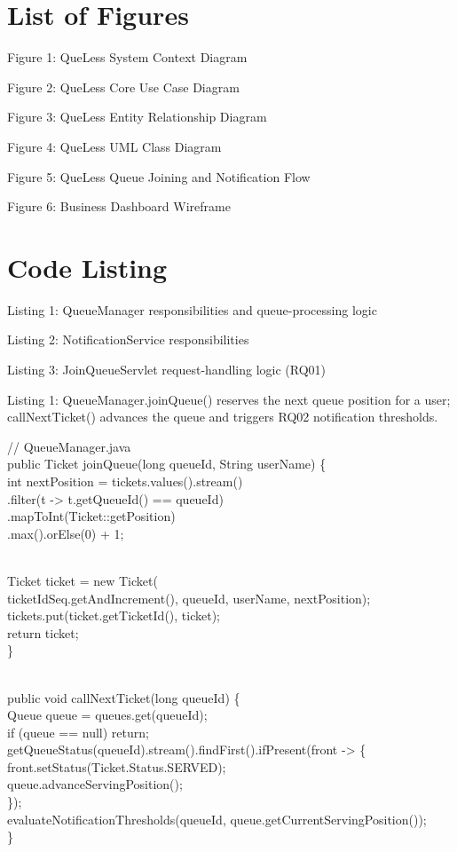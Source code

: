 \documentclass[
]{article}
\begin{document}
\section{List of Figures}\label{list-of-figures}

Figure 1: QueLess System Context Diagram

Figure 2: QueLess Core Use Case Diagram

Figure 3: QueLess Entity Relationship Diagram

Figure 4: QueLess UML Class Diagram

Figure 5: QueLess Queue Joining and Notification Flow

Figure 6: Business Dashboard Wireframe

\section{Code Listing}\label{code-listing}

Listing 1: QueueManager responsibilities and queue-processing logic

Listing 2: NotificationService responsibilities

Listing 3: JoinQueueServlet request-handling logic (RQ01)

Listing 1: QueueManager.joinQueue() reserves the next queue position for
a user; callNextTicket() advances the queue and triggers RQ02
notification thresholds.

// QueueManager.java\\
public Ticket joinQueue(long queueId, String userName) \{\\
int nextPosition = tickets.values().stream()\\
.filter(t -\textgreater{} t.getQueueId() == queueId)\\
.mapToInt(Ticket::getPosition)\\
.max().orElse(0) + 1;\\
\strut \\
Ticket ticket = new Ticket(\\
ticketIdSeq.getAndIncrement(), queueId, userName, nextPosition);\\
tickets.put(ticket.getTicketId(), ticket);\\
return ticket;\\
\}\\
\strut \\
public void callNextTicket(long queueId) \{\\
Queue queue = queues.get(queueId);\\
if (queue == null) return;\\
getQueueStatus(queueId).stream().findFirst().ifPresent(front
-\textgreater{} \{\\
front.setStatus(Ticket.Status.SERVED);\\
queue.advanceServingPosition();\\
\});\\
evaluateNotificationThresholds(queueId,
queue.getCurrentServingPosition());\\
\}
\end{document}
